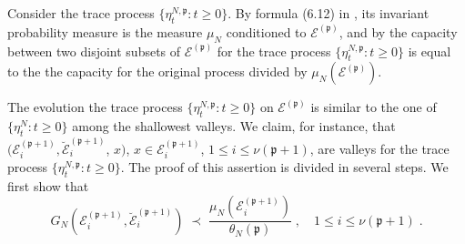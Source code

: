 \documentclass[reqno]{amsart}
\begin{document}
Consider the trace process $\{\eta^{N,{{\mathfrak p}}}_t : t\ge 0\}$. By formula
(6.12) in \cite{bl2}, its invariant probability measure is the measure
$\mu_N$ conditioned to ${{\mathcal E}}^{({{\mathfrak p}})}$, and by \cite[Lemma 6.9]{bl2}
the capacity between two disjoint subsets of ${{\mathcal E}}^{({{\mathfrak p}})}$ for the
trace process $\{\eta^{N,{{\mathfrak p}}}_t : t\ge 0\}$ is equal to the the
capacity for the original process divided by $\mu_N({{\mathcal E}}^{({{\mathfrak p}})})$.

The evolution the trace process $\{\eta^{N,{{\mathfrak p}}}_t : t\ge 0\}$ on
${{\mathcal E}}^{({{\mathfrak p}})}$ is similar to the one of $\{\eta^{N}_t : t\ge 0\}$
among the shallowest valleys. We claim, for instance, that $({{\mathcal E}}^{({{\mathfrak p}} +1)}_i , \breve{{{\mathcal E}}}^{({{\mathfrak p}} +1)}_i$, $x)$, $x\in {{\mathcal E}}^{({{\mathfrak p}} +1)}_i$, $1\le i\le \nu({{\mathfrak p}} +1)$, are valleys for the
trace process $\{\eta^{N,{{\mathfrak p}}}_t : t\ge 0\}$.  The proof of this
assertion is divided in several steps. We first show that
\begin{equation}
\label{19}
G_N({{\mathcal E}}^{({{\mathfrak p}} +1)}_i, \breve{{{\mathcal E}}}^{({{\mathfrak p}} +1)}_i) \;\prec\;
\frac{\mu_N({{\mathcal E}}^{({{\mathfrak p}} +1)}_i)}{\theta_N({{\mathfrak p}})}\;, 
\quad 1\le i\le \nu({{\mathfrak p}} +1)\; . 
\end{equation}
\end{document}
